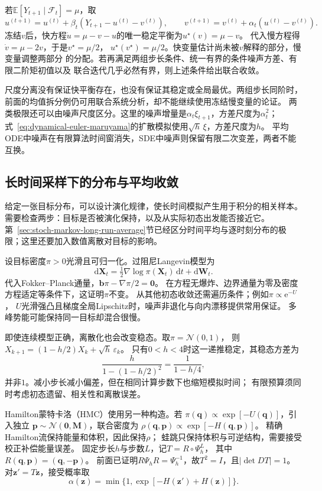\begin{example}[分解同一个未知均值的快慢更新]
  \label{ex:stoch-two-timescale-mean-splitting}
  若$\mathbb E[Y_{t+1}\mid\mathcal F_t]=\mu$，取
  \[
    u^{(t+1)}=u^{(t)}+\beta_t(Y_{t+1}-u^{(t)}-v^{(t)}),\qquad
    v^{(t+1)}=v^{(t)}+\alpha_t(u^{(t)}-v^{(t)}).
  \]
  冻结$v$后，快方程$\dot u=\mu-v-u$的唯一稳定平衡为$u^\star(v)=\mu-v$。
  代入慢方程得$\dot v=\mu-2v$，于是$v^\star=\mu/2$，
  $u^\star(v^\star)=\mu/2$。快变量估计尚未被$v$解释的部分，慢变量调整两部分
  的分配。若再满足两组步长条件、统一有界的条件噪声方差、有限二阶矩初值以及
  联合迭代几乎必然有界，则上述条件给出联合收敛。
\end{example}
尺度分离没有保证快平衡存在，也没有保证其稳定或全局最优。两组步长同阶时，
前面的均值拆分例仍可用联合系统分析，却不能继续使用冻结慢变量的论证。
两类极限还可以由噪声尺度区分。这里的噪声增量是$\alpha_t\xi_{t+1}$，方差尺度为$\alpha_t^2$；式~\eqref{eq:dynamical-euler-maruyama}的扩散模拟使用$\sqrt h\,\xi$，方差尺度为$h$。
平均ODE中噪声在有限算法时间窗消失，SDE中噪声则保留有限二次变差，两者不能互换。

\subsection{长时间采样下的分布与平均收敛}
给定一张目标分布，可以设计演化规律，使长时间模拟产生用于积分的相关样本。需要检查两步：目标是否被演化保持，以及从实际初态出发能否接近它。第~\ref{sec:stoch-markov-long-run-average}节已经区分时间平均与逐时刻分布的极限；这里还要加入数值离散对目标的影响。

设目标密度$\pi>0$光滑且可归一化。过阻尼Langevin模型为
\begin{equation}
 \mathrm d\bm X_t=\tfrac12\nabla\log\pi(\bm X_t)\,\mathrm dt+\mathrm d\bm W_t.
 \label{eq:dynamical-langevin-sde}
\end{equation}
代入Fokker--Planck通量，$\bm b\pi-\nabla\pi/2=\bm0$。
在方程无爆炸、边界通量为零及密度方程适定等条件下，这证明$\pi$不变。
从其他初态收敛还需遍历条件；例如$\pi\propto\mathrm e^{-U}$，
$U$光滑强凸且梯度全局Lipschitz时，噪声非退化与向内漂移提供常用保证。
多峰势能可能保持同一目标却混合很慢。

即使连续模型正确，离散化也会改变稳态。取$\pi=\mathcal N(0,1)$，
则$X_{k+1}=(1-h/2)X_k+\sqrt h\,\varepsilon_k$。
只有$0<h<4$时这一递推稳定，其稳态方差为
\[
  \frac{h}{1-(1-h/2)^2}=\frac1{1-h/4},
\]
并非$1$。减小步长减小偏差，但在相同计算步数下也缩短模拟时间；
有限预算须同时考虑初态遗留、相关性和离散误差。

Hamilton蒙特卡洛（HMC）使用另一种构造。若
$\pi(\bm q)\propto\exp[-U(\bm q)]$，引入独立
$\bm p\sim\mathcal N(\bm0,\bm M)$，联合密度为
$\rho(\bm q,\bm p)\propto\exp[-H(\bm q,\bm p)]$。
精确Hamilton流保持能量和体积，因此保持$\rho$；
蛙跳只保持体积与可逆结构，需要接受校正补偿能量误差。
固定步长$h$与步数$L$，记$T=R\circ\Psi_h^L$，
其中$R(\bm q,\bm p)=(\bm q,-\bm p)$。
前面已证明$R\Psi_hR=\Psi_h^{-1}$，故$T^2=I$，且$|\det DT|=1$。
对$\bm z' =T\bm z$，接受概率取
\begin{equation}
 \alpha(\bm z)=\min\{1,\exp[-H(\bm z')+H(\bm z)]\}.
 \label{eq:dynamical-hmc-acceptance}
\end{equation}

